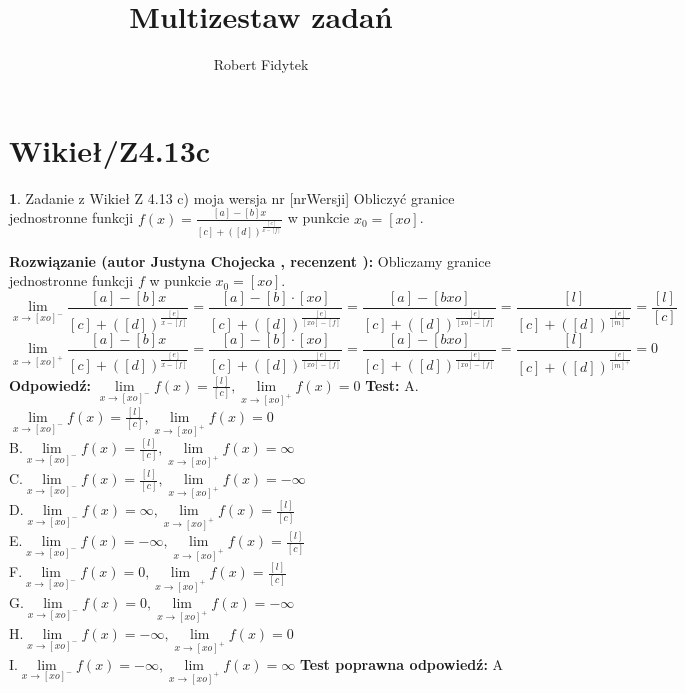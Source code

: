 \documentclass[12pt, a4paper]{article}
\title{Multizestaw zadań}
\author{Robert Fidytek}
\date{}
\theoremstyle{definition} %
\newtheorem{zad}{}
\newcommand{\kategoria}[1]{\section{#1}} %
\newcommand{\zadStart}[1]{\begin{zad}#1\newline} %
\newcommand{\zadStop}{\end{zad}}   %
\newcommand{\rozwStart}[2]{\noindent \textbf{Rozwiązanie (autor #1 , recenzent #2): }\newline} %
\newcommand{\rozwStop}{\newline}                                            %
\newcommand{\odpStart}{\noindent \textbf{Odpowiedź:}\newline}    %
\newcommand{\odpStop}{\newline}                                             %
\newcommand{\testStart}{\noindent \textbf{Test:}\newline} %
\newcommand{\testStop}{\newline} %
\newcommand{\kluczStart}{\noindent \textbf{Test poprawna odpowiedź:}\newline} %
\newcommand{\kluczStop}{\newline} %
\begin{document}
\maketitle


\kategoria{Wikieł/Z4.13c}
\zadStart{Zadanie z Wikieł Z 4.13 c) moja wersja nr [nrWersji]}
Obliczyć granice jednostronne funkcji $f(x)=\frac{[a]-[b]x}{[c]+([d])^{\frac{[e]}{x-[f]}}}$ w punkcie $x_{0}=[xo]$. 
\zadStop
\rozwStart{Justyna Chojecka}{}
Obliczamy granice jednostronne funkcji $f$ w punkcie $x_{0}=[xo]$.
$$\lim\limits_{x\to [xo]^{-}}\frac{[a]-[b]x}{[c]+([d])^{\frac{[e]}{x-[f]}}}=\frac{[a]-[b]\cdot[xo]}{[c]+([d])^{\frac{[e]}{[xo]-[f]}}}=\frac{[a]-[bxo]}{[c]+([d])^{\frac{[e]}{[xo]-[f]}}}=\frac{[l]}{[c]+([d])^{\frac{[e]}{[m]^{-}}}}=\frac{[l]}{[c]}$$
$$\lim\limits_{x\to [xo]^{+}}\frac{[a]-[b]x}{[c]+([d])^{\frac{[e]}{x-[f]}}}=\frac{[a]-[b]\cdot[xo]}{[c]+([d])^{\frac{[e]}{[xo]-[f]}}}=\frac{[a]-[bxo]}{[c]+([d])^{\frac{[e]}{[xo]-[f]}}}=\frac{[l]}{[c]+([d])^{\frac{[e]}{[m]^{+}}}}=0$$
\rozwStop
\odpStart
$\lim\limits_{x\to [xo]^{-}}f(x)=\frac{[l]}{[c]}, \lim\limits_{x\to [xo]^{+}}f(x)=0$
\odpStop
\testStart
A.$\lim\limits_{x\to [xo]^{-}}f(x)=\frac{[l]}{[c]}, \lim\limits_{x\to [xo]^{+}}f(x)=0$\\
B.$\lim\limits_{x\to [xo]^{-}}f(x)=\frac{[l]}{[c]}, \lim\limits_{x\to [xo]^{+}}f(x)=\infty$\\
C.$\lim\limits_{x\to [xo]^{-}}f(x)=\frac{[l]}{[c]}, \lim\limits_{x\to [xo]^{+}}f(x)=-\infty$\\
D.$\lim\limits_{x\to [xo]^{-}}f(x)=\infty, \lim\limits_{x\to [xo]^{+}}f(x)=\frac{[l]}{[c]}$\\
E.$\lim\limits_{x\to [xo]^{-}}f(x)=-\infty, \lim\limits_{x\to [xo]^{+}}f(x)=\frac{[l]}{[c]}$\\
F.$\lim\limits_{x\to [xo]^{-}}f(x)=0, \lim\limits_{x\to [xo]^{+}}f(x)=\frac{[l]}{[c]}$\\
G.$\lim\limits_{x\to [xo]^{-}}f(x)=0, \lim\limits_{x\to [xo]^{+}}f(x)=-\infty$\\
H.$\lim\limits_{x\to [xo]^{-}}f(x)=-\infty, \lim\limits_{x\to [xo]^{+}}f(x)=0$\\
I.$\lim\limits_{x\to [xo]^{-}}f(x)=-\infty, \lim\limits_{x\to [xo]^{+}}f(x)=\infty$
\testStop
\kluczStart
A
\kluczStop
\end{document}
